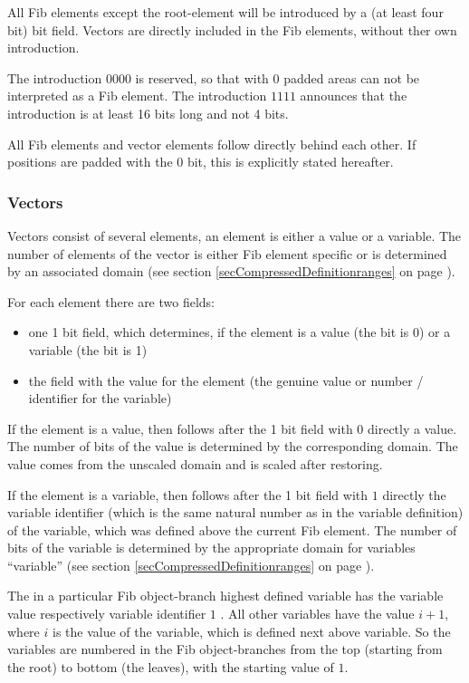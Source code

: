 All Fib elements except the root-element will be introduced by a (at least four bit) bit field. Vectors are directly included in the Fib elements, without ther own introduction.

The introduction $0000$ is reserved, so that with 0 padded areas can not be interpreted as a Fib element. The introduction $1111$ announces that the introduction is at least 16 bits long and not 4 bits.

All Fib elements and vector elements follow directly behind each other. If positions are padded with the 0 bit, this is explicitly stated hereafter.


\subsubsection{Vectors}
\label{secCompressedVector}

Vectors consist of several elements, an element is either a value or a variable. The number of elements of the vector is either Fib element specific or is determined by an associated domain (see section \ref{secCompressedDefinitionranges} on page \pageref{secCompressedDefinitionranges}).

\noindent\bigskip
For each element there are two fields:
\begin{itemize}
 \item one 1 bit field, which determines, if the element is a value (the bit is 0) or a variable (the bit is 1)
 \item the field with the value for the element (the genuine value or number / identifier for the variable)
\end{itemize}

If the element is a value, then follows after the 1 bit field with $0$ directly a value. The number of bits of the value is determined by the corresponding domain. The value comes from the unscaled domain and is scaled after restoring.

If the element is a variable, then follows after the 1 bit field with $1$ directly the variable identifier (which is the same natural number as in the variable definition) of the variable, which was defined above the current Fib element. The number of bits of the variable is determined by the appropriate domain for variables ``variable'' (see section \ref{secCompressedDefinitionranges} on page \pageref{secCompressedDefinitionranges}).

The in a particular Fib object-branch highest defined variable has the variable value respectively variable identifier $1$ . All other variables have the value $i+1$, where $i$ is the value of the variable, which is defined next above variable. So the variables are numbered in the Fib object-branches from the top (starting from the root) to bottom (the leaves), with the starting value of $1$.



